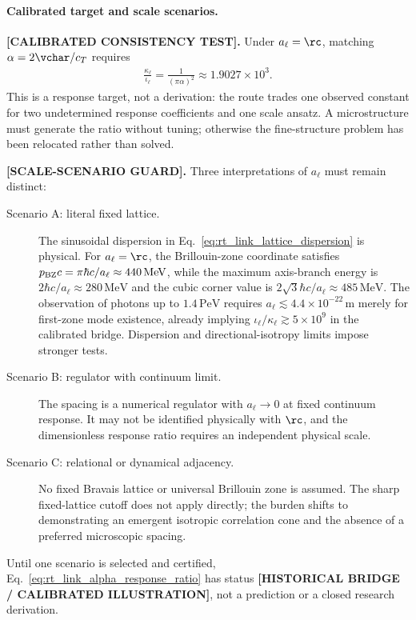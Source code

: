 \paragraph{Calibrated target and scale scenarios.}
\textbf{[CALIBRATED CONSISTENCY TEST].}
Under \(a_\ell=\rc\), matching \(\alpha=2\vchar/c_T\) requires
\begin{align}
    \frac{\kappa_\ell}{\iota_\ell}
    =
    \frac{1}{(\pi\alpha)^2}
    \approx
    1.9027\times10^3.
    \label{eq:rt_link_alpha_ratio_target}
\end{align}
This is a response target, not a derivation: the route trades one observed
constant for two undetermined response coefficients and one scale ansatz.  A
microstructure must generate the ratio without tuning; otherwise the
fine-structure problem has been relocated rather than solved.

\textbf{[SCALE-SCENARIO GUARD].}
Three interpretations of \(a_\ell\) must remain distinct:
\begin{description}
    \item[Scenario A: literal fixed lattice.] The sinusoidal dispersion in
    Eq.~\eqref{eq:rt_link_lattice_dispersion} is physical.  For
    \(a_\ell=\rc\), the Brillouin-zone coordinate satisfies
    \(p_{\rm BZ}c=\pi\hbar c/a_\ell\approx440\,\mathrm{MeV}\), while the
    maximum axis-branch energy is
    \(2\hbar c/a_\ell\approx280\,\mathrm{MeV}\) and the cubic corner value is
    \(2\sqrt3\hbar c/a_\ell\approx485\,\mathrm{MeV}\).  The observation of
    photons up to \(1.4\,\mathrm{PeV}\) \cite{LHAASO2021PeV} requires
    \(a_\ell\lesssim4.4\times10^{-22}\,\mathrm m\) merely for first-zone mode
    existence, already implying \(\iota_\ell/\kappa_\ell\gtrsim5\times10^9\)
    in the calibrated bridge.  Dispersion and directional-isotropy limits impose
    stronger tests.
    \item[Scenario B: regulator with continuum limit.] The spacing is a numerical
    regulator with \(a_\ell\to0\) at fixed continuum response.  It may not be
    identified physically with \(\rc\), and the dimensionless response ratio
    requires an independent physical scale.
    \item[Scenario C: relational or dynamical adjacency.] No fixed Bravais lattice
    or universal Brillouin zone is assumed.  The sharp fixed-lattice cutoff does
    not apply directly; the burden shifts to demonstrating an emergent isotropic
    correlation cone and the absence of a preferred microscopic spacing.
\end{description}
Until one scenario is selected and certified,
Eq.~\eqref{eq:rt_link_alpha_response_ratio} has status
\textbf{[HISTORICAL BRIDGE / CALIBRATED ILLUSTRATION]}, not a prediction or a
closed research derivation.

